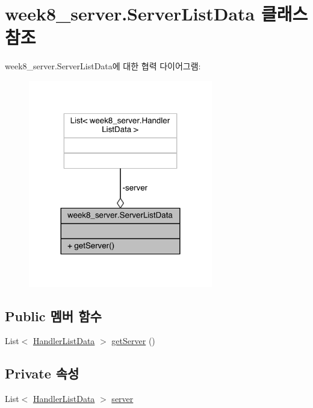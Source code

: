 \hypertarget{classweek8__server_1_1_server_list_data}{\section{week8\-\_\-server.\-Server\-List\-Data 클래스 참조}
\label{classweek8__server_1_1_server_list_data}
}


week8\-\_\-server.\-Server\-List\-Data에 대한 협력 다이어그램\-:
\nopagebreak
\begin{figure}[H]
\begin{center}
\leavevmode
\includegraphics[width=228pt]{classweek8__server_1_1_server_list_data__coll__graph}
\end{center}
\end{figure}
\subsection*{Public 멤버 함수}
\begin{DoxyCompactItemize}
\item 
List$<$ \hyperlink{classweek8__server_1_1_handler_list_data}{Handler\-List\-Data} $>$ \hyperlink{classweek8__server_1_1_server_list_data_a290deb1c104276fd65c014e4e4d790f0}{get\-Server} ()
\end{DoxyCompactItemize}
\subsection*{Private 속성}
\begin{DoxyCompactItemize}
\item 
List$<$ \hyperlink{classweek8__server_1_1_handler_list_data}{Handler\-List\-Data} $>$ \hyperlink{classweek8__server_1_1_server_list_data_a732d8343a7bb9f2afd473a397a9937aa}{server}
\end{DoxyCompactItemize}



